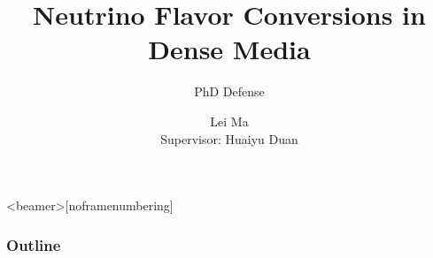 \documentclass[9pt]{beamer}
\title{Neutrino Flavor Conversions in Dense Media%
} %
\author{Lei Ma\\ Supervisor: Huaiyu Duan}
\subtitle{PhD Defense} %
\begin{document}
  \frame{\maketitle}


  \begin{darkframes}


      \begin{frame}<beamer>[noframenumbering]
        \frametitle{Outline}
        \tableofcontents
      \end{frame}


























  \end{darkframes}



\appendix


\end{document}
